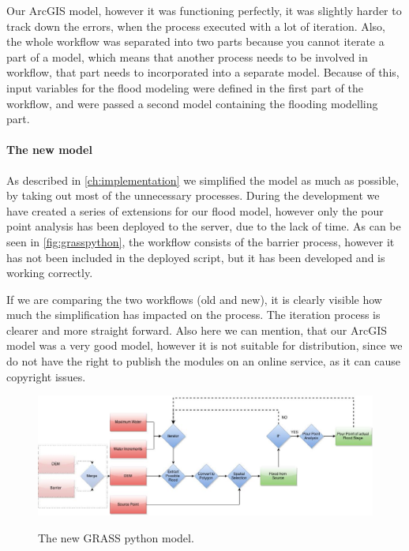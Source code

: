 Our ArcGIS model, however it was functioning perfectly, it was slightly harder to track down the errors, when the process executed with a lot of iteration. Also, the whole workflow was separated into two parts because you cannot iterate a part of a model, which means that another process needs to be involved in workflow, that part needs to incorporated into a separate model. Because of this, input variables for the flood modeling were defined in the first part of the workflow, and were passed a second model containing the flooding modelling part.

\paragraph{The new model}

As described in \autoref{ch:implementation} we simplified the model as much as possible, by taking out most of the unnecessary processes. During the development we have created a series of extensions for our flood model, however only the pour point analysis has been deployed to the server, due to the lack of time. As can be seen in \autoref{fig:grasspython}, the workflow consists of the barrier process, however it has not been included in the deployed script, but it has been developed and is working correctly.

If we are comparing the two workflows (old and new), it is clearly visible how much the simplification has impacted on the process. The iteration process is clearer and more straight forward. Also here we can mention, that our ArcGIS model was a very good model, however it is not suitable for distribution, since we do not have the right to publish the modules on an online service, as it can cause copyright issues. 

\begin{figure}[h!]
\centering
	{\includegraphics[width=\linewidth]{gfx/Analysis_OldWork/3.jpg}}
\caption{The new GRASS python model.}
\label{fig:grasspython}
\end{figure}\\

